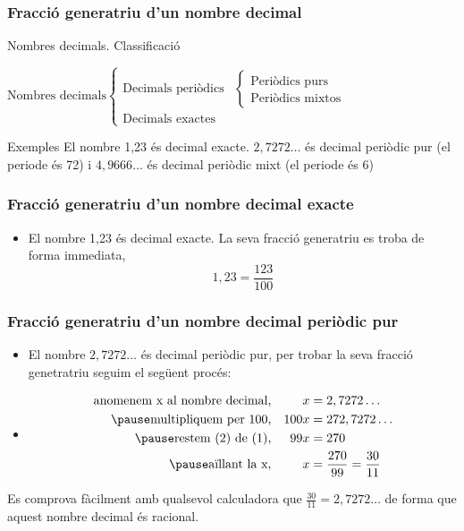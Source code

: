 \documentclass{beamer}
\begin{document}
\begin{frame}\frametitle{Fracció generatriu d'un nombre decimal}
\begin{block}{Nombres decimals. Classificació}

$\text{Nombres decimals}\begin{cases} \text{Decimals periòdics}&
\begin{cases}
\text{Periòdics purs}\\
\text{Periòdics mixtos}
\end{cases}\\
\text{Decimals exactes}
\end{cases}$
\end{block}\pause
\begin{exampleblock}{Exemples}
El nombre 1,23 és decimal exacte. $2,7272\ldots$ és decimal
periòdic pur (el periode és 72) i $4,9666\ldots$ és decimal
periòdic mixt (el periode és 6)
\end{exampleblock}
\end{frame}
\begin{frame}\frametitle{Fracció generatriu d'un nombre decimal exacte}
\begin{itemize}
\item
El nombre 1,23 és decimal exacte. La seva fracció generatriu es
troba de forma immediata,\\ $$1,23=\frac{123}{100}$$
\end{itemize}
\end{frame}
\begin{frame}\frametitle{Fracció generatriu d'un nombre decimal periòdic pur}
\begin{itemize}
\item
El nombre $2,7272\ldots$ és decimal periòdic pur, per trobar la
seva fracció genetratriu seguim el següent procés:
\end{itemize}\pause
\begin{itemize}
\item[]
\begin{align}
 \text{anomenem x al nombre decimal,}  & &x&=2,7272\ldots \\\pause
\text{multipliquem per 100,}&&100x&= 272,7272\ldots \\\pause
\text{restem (2) de (1),}& &99x&=270 \\\pause \text{aïllant la x,}
& &x &=\frac{270}{99}=\frac{30}{11}
\end{align}
\end{itemize}\pause
Es comprova fàcilment amb qualsevol calculadora que
$\frac{30}{11}=2,7272\ldots$ de forma que aquest nombre decimal és
racional.
\end{frame}
\end{document}
